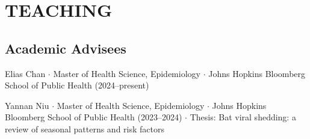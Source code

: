 \documentclass{cv}
\begin{document}




\newpage
{}
\parttwo



\section*{TEACHING}

\subsection*{Academic Advisees}

Elias Chan $\cdot$ Master of Health Science, Epidemiology $\cdot$ Johns Hopkins Bloomberg School of Public Health (2024--present)

Yannan Niu $\cdot$ Master of Health Science, Epidemiology $\cdot$ Johns Hopkins Bloomberg School of Public Health (2023--2024) $\cdot$ Thesis: Bat viral shedding: a review of seasonal patterns and risk factors
\end{document}

